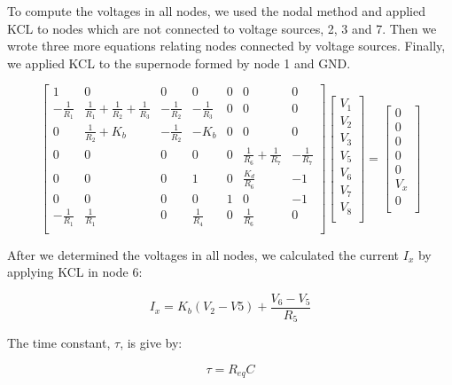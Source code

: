 To compute the voltages in all nodes, we used the nodal method and applied KCL to nodes which are not connected to voltage sources, 2, 3 and 7. Then we wrote three more equations relating nodes connected by voltage sources. Finally, we applied KCL to the supernode formed by node 1 and GND.

\[
{\begin{bmatrix}
1 & 0 & 0 & 0 & 0 & 0 & 0\\
-\frac{1}{R_1} & \frac{1}{R_1}+\frac{1}{R_2}+\frac{1}{R_3} & -\frac{1}{R_2} & -\frac{1}{R_3} & 0 & 0 & 0\\
0 & \frac{1}{R_2}+K_b & -\frac{1}{R_2} & -K_b & 0 & 0 & 0\\
0 & 0 & 0 & 0 & 0 & \frac{1}{R_6}+\frac{1}{R_7} & -\frac{1}{R_7}\\
0 & 0 & 0 & 1 & 0 & \frac{K_d}{R_6} & -1\\
0 & 0 & 0 & 0 & 1 & 0 & -1\\
-\frac{1}{R_1} & \frac{1}{R_1} & 0 & \frac{1}{R_4} & 0 & \frac{1}{R_6} & 0\\
            \end{bmatrix}
            }
{\begin{bmatrix}
V_1\\
V_2\\
V_3\\
V_5\\
V_6\\
V_7\\
V_8\\
            \end{bmatrix}
            }
    =
{\begin{bmatrix}
0\\
0\\
0\\
0\\
0\\
V_x\\
0\\
            \end{bmatrix}
            }
\]

After we determined the voltages in all nodes, we calculated the current $I_x$ by applying KCL in node 6:

\begin{equation}
  I_x = K_b(V_2-V5)+\frac{V_6-V_5}{R_5}
\end{equation}

The time constant, $\tau$, is give by:

\begin{equation}
  \tau = R_{eq}C
\end{equation}

